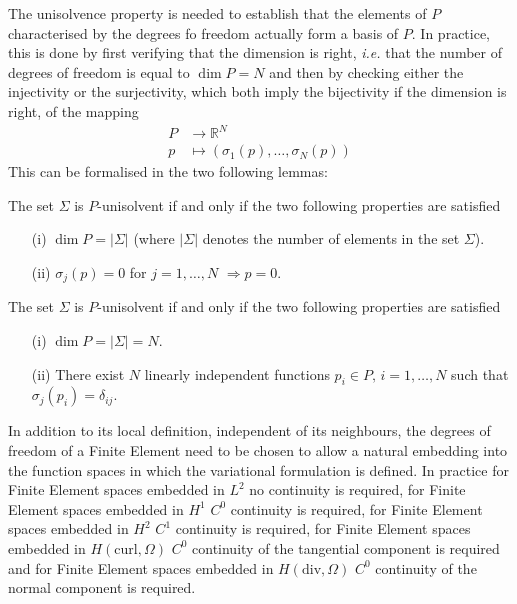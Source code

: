The unisolvence property is needed to establish that the elements of $P$ characterised by the degrees fo freedom actually form a basis of $P$. In practice, this is done by first verifying that the dimension is right, \textit{i.e.} that the number of degrees of freedom is equal to $\dim P=N$ and then by checking either the injectivity or the surjectivity, which both imply the bijectivity if the dimension is right, of the mapping
\begin{align*}
P &\rightarrow \mathbb{R}^N\\
p &\mapsto (\sigma_1(p), \dots,  \sigma_N(p))
\end{align*}
This can be formalised in the two following lemmas:
\begin{lemma}\label{lemma:unisolvInj}
The set $\Sigma$ is $P$-unisolvent if and only if the two following properties are satisfied
\begin{itemize}
\item[(i)] $\dim P = |\Sigma|$ (where $|\Sigma|$ denotes the number of elements in the set $\Sigma$).
\item[(ii)] $\sigma_j(p)=0$ for $j=1, \dots, N$ $\Rightarrow p=0$.
\end{itemize}
\end{lemma}

\begin{lemma}\label{lemma:unisolvSurj}
The set $\Sigma$ is $P$-unisolvent if and only if the two following properties are satisfied
\begin{itemize}
\item[(i)] $\dim P = |\Sigma|=N$.
\item[(ii)] There exist $N$ linearly independent functions $p_i\in P, \,i=1, \dots, N$ such that $\sigma_j(p_i)=\delta_{ij}$.
\end{itemize}
\end{lemma}

In addition to its local definition, independent of its neighbours, the degrees of freedom of a Finite Element need to be chosen to allow a natural embedding into the function spaces in which the variational formulation is defined.
In practice for Finite Element spaces embedded in $L^2$ no continuity is required,   for Finite Element spaces embedded in $H^1$ $C^0$ continuity is required, for Finite Element spaces embedded in $H^2$ $C^1$ continuity is required, for Finite Element spaces embedded in $ H(\textrm{curl}, \Omega) $ $C^0$ continuity of the tangential component is required and for Finite Element spaces embedded in $ H(\textrm{div}, \Omega) $ $C^0$ continuity of the normal component is required. 

